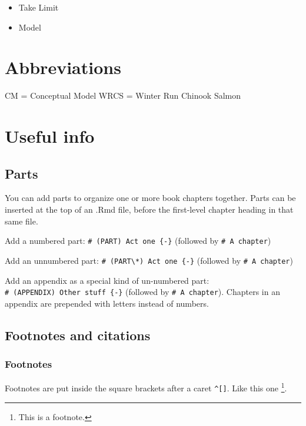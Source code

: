 \documentclass[
]{book}
\providecommand{\tightlist}{%
  \setlength{\itemsep}{0pt}\setlength{\parskip}{0pt}}
\theoremstyle{definition}
\theoremstyle{definition}
\theoremstyle{definition}
\theoremstyle{definition}
\theoremstyle{remark}
\begin{document}
\begin{itemize}
\tightlist
\item
  Take Limit
\item
  Model
\end{itemize}

\hypertarget{abbreviations}{%
\chapter{Abbreviations}\label{abbreviations}}

CM = Conceptual Model
WRCS = Winter Run Chinook Salmon

\hypertarget{useful-info}{%
\chapter{Useful info}\label{useful-info}}

\hypertarget{parts}{%
\section{Parts}\label{parts}}

You can add parts to organize one or more book chapters together. Parts can be inserted at the top of an .Rmd file, before the first-level chapter heading in that same file.

Add a numbered part: \texttt{\#\ (PART)\ Act\ one\ \{-\}} (followed by \texttt{\#\ A\ chapter})

Add an unnumbered part: \texttt{\#\ (PART\textbackslash{}*)\ Act\ one\ \{-\}} (followed by \texttt{\#\ A\ chapter})

Add an appendix as a special kind of un-numbered part: \texttt{\#\ (APPENDIX)\ Other\ stuff\ \{-\}} (followed by \texttt{\#\ A\ chapter}). Chapters in an appendix are prepended with letters instead of numbers.

\hypertarget{footnotes-and-citations}{%
\section{Footnotes and citations}\label{footnotes-and-citations}}

\hypertarget{footnotes}{%
\subsection{Footnotes}\label{footnotes}}

Footnotes are put inside the square brackets after a caret \texttt{\^{}{[}{]}}. Like this one \footnote{This is a footnote.}.
\end{document}
